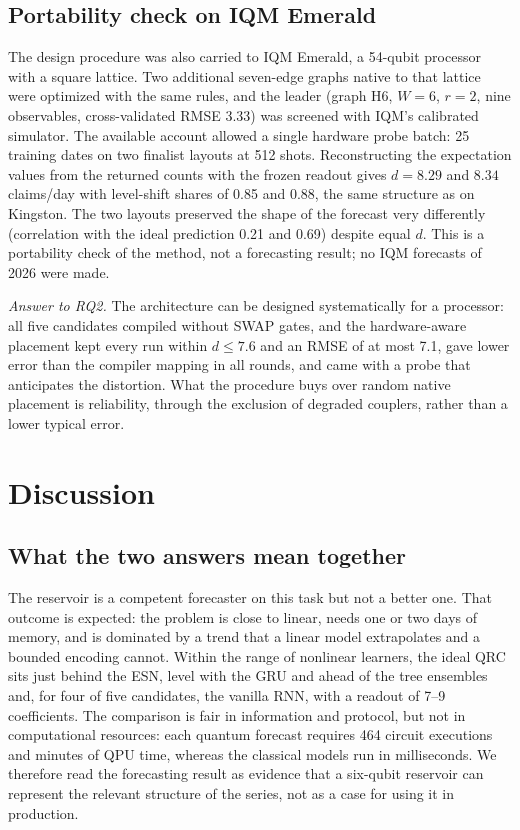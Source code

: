 \documentclass[journal]{IEEEtran}
\begin{document}
\subsection{Portability check on IQM Emerald}
The design procedure was also carried to IQM Emerald, a 54-qubit processor with a square lattice. Two additional seven-edge graphs native to that lattice were optimized with the same rules, and the leader (graph H6, $W=6$, $r=2$, nine observables, cross-validated RMSE 3.33) was screened with IQM's calibrated simulator. The available account allowed a single hardware probe batch: 25 training dates on two finalist layouts at 512 shots. Reconstructing the expectation values from the returned counts with the frozen readout gives $d=8.29$ and $8.34$ claims/day with level-shift shares of 0.85 and 0.88, the same structure as on Kingston. The two layouts preserved the shape of the forecast very differently (correlation with the ideal prediction 0.21 and 0.69) despite equal $d$. This is a portability check of the method, not a forecasting result; no IQM forecasts of 2026 were made.

\emph{Answer to RQ2.} The architecture can be designed systematically for a processor: all five candidates compiled without SWAP gates, and the hardware-aware placement kept every run within $d\le7.6$ and an RMSE of at most 7.1, gave lower error than the compiler mapping in all rounds, and came with a probe that anticipates the distortion. What the procedure buys over random native placement is reliability, through the exclusion of degraded couplers, rather than a lower typical error.

\section{Discussion}
\subsection{What the two answers mean together}
The reservoir is a competent forecaster on this task but not a better one. That outcome is expected: the problem is close to linear, needs one or two days of memory, and is dominated by a trend that a linear model extrapolates and a bounded encoding cannot. Within the range of nonlinear learners, the ideal QRC sits just behind the ESN, level with the GRU and ahead of the tree ensembles and, for four of five candidates, the vanilla RNN, with a readout of 7--9 coefficients. The comparison is fair in information and protocol, but not in computational resources: each quantum forecast requires 464 circuit executions and minutes of QPU time, whereas the classical models run in milliseconds. We therefore read the forecasting result as evidence that a six-qubit reservoir can represent the relevant structure of the series, not as a case for using it in production.
\end{document}
